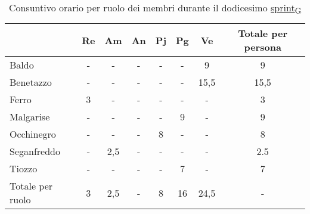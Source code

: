 \begin{table}[!h]
    \centering
    \begin{tabular}{ | l | c | c | c | c | c | c | c | }
        \hline
        \textbf{} & \textbf{Re} & \textbf{Am} &\textbf{An} & \textbf{Pj} & \textbf{Pg} & \textbf{Ve} & \textbf{Totale per persona} \\
        \hline
        Baldo            &  -   &  -   &  -   &  -   &  -   &  9   &  9   \\
        Benetazzo        &  -   &  -   &  -   &  -   &  -   & 15,5 & 15,5 \\
        Ferro            &  3   &  -   &  -   &  -   &  -   &  -   &  3   \\
        Malgarise        &  -   &  -   &  -   &  -   &  9   &  -   &  9   \\
        Occhinegro       &  -   &  -   &  -   &  8   &  -   &  -   &  8   \\
        Seganfreddo      &  -   &  2,5 &  -   &  -   &  -   &  -   &  2.5 \\
        Tiozzo           &  -   &  -   &  -   &  -   &  7   &  -   &  7   \\
        \hline
        Totale per ruolo &  3   &  2,5 &  -   &  8   & 16   & 24,5 &  -   \\
        \hline
    \end{tabular}
    \caption{Consuntivo orario per ruolo dei membri durante il dodicesimo \href{https://7last.github.io/docs/rtb/documentazione-interna/glossario\#sprint}{sprint\textsubscript{G}}}
\end{table}

